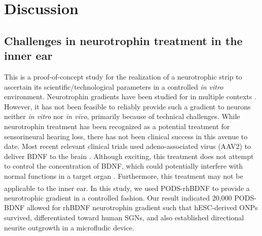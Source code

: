 \documentclass[review]{elsarticle}
\begin{document}

\section {Discussion}%
\subsection{Challenges in neurotrophin treatment in the inner ear}  
This is a proof-of-concept study for the realization of a neurotrophic strip to ascertain its scientific/technological parameters in a controlled \textit{in vitro} environment. Neurotrophin gradients have been studied for in multiple contexts \cite{Keefe2017,Awad2015,Hollis2011}. However, it has not been feasible to reliably provide such a gradient to neurons neither \textit{in vitro} nor \textit{in vivo}, primarily because of technical challenges. While neurotrophin treatment has been recognized as a potential treatment for sensorineural hearing loss, there has not been clinical success in this avenue to date. Most recent relevant clinical trials used adeno-associated virus (AAV2) to deliver BDNF to the brain \cite{Nagahara2018}. Although exciting, this treatment does not attempt to control the concentration of BDNF, which could potentially interfere with normal functions in a target organ \cite{Croll1999}. Furthermore, this treatment may not be applicable to the inner ear. In this study, we used PODS\textsuperscript{\textregistered}-rhBDNF to provide a neurotrophic gradient in a controlled fashion. Our result indicated 20,000 PODS-BDNF allowed for rhBDNF neurotrophin gradient such that hESC-derived ONPs survived, differentiated toward human SGNs, and also established directional neurite outgrowth in a microfludic device. 
\end{document}
